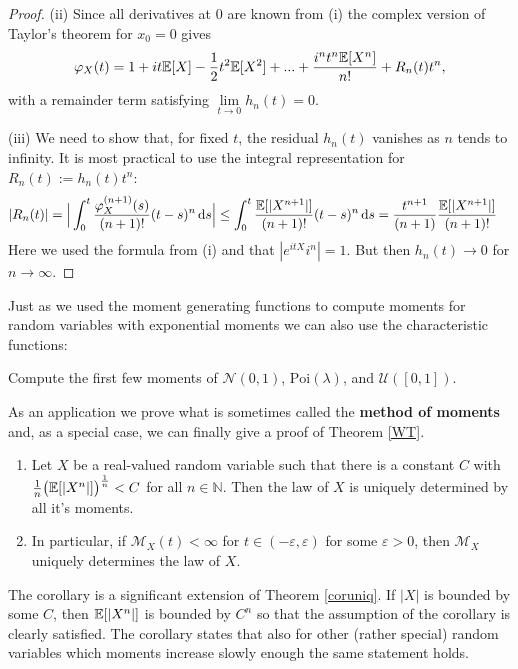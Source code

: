 \begin{proof}[Proof]
	(ii) Since all derivatives at $0$ are known from (i) the complex version of Taylor's theorem for $x_0 =0$ gives
			\begin{align*}
				\varphi_X(t) = 1+  i t \mathbb{E}[X] - \frac{1}{2} t^2 \mathbb{E} [ X^2] + ... + \frac{i^n t^n\mathbb{E} [X^n]}{n!} + R_n(t)t^n,
			\end{align*}
			with a remainder term satisfying $\lim\limits_{t\to 0} h_n(t) = 0$.\smallskip

	(iii)
			We need to show that, for fixed $t$, the residual $h_n(t)$ vanishes as $n$ tends to infinity. It is most practical to use the integral representation for $R_n(t):=h_n(t)t^n$:
			\begin{align*}
				\lvert R_n(t) \rvert = \Big\lvert \int_0^t \frac{\varphi_X^{(n+1)}(s)}{(n+1)!}(t-s)^n \, \mathrm{d} s \Big\rvert &\leq \int_0^t \frac{\mathbb{E} [ \lvert X^{n+1}\rvert] }{(n+1)!}(t-s)^n \, \mathrm{d} s
				 = \frac{t^{n+1}}{(n+1)} \frac{\mathbb{E}[ \lvert X^{n+1}\rvert ]}{(n+1)!}
			\end{align*}
			Here we used the formula from (i) and that $|e^{itX}i^n|=1$. But then $h_n(t)\to 0$ for $n\to\infty$.
\end{proof}
Just as we used the moment generating functions to compute moments for random variables with exponential moments we can also use the characteristic functions:
\begin{luebung}
	Compute the first few moments of $\mathcal N(0,1)$, $\text{Poi}(\lambda)$, and $\mathcal U([0,1])$.
\end{luebung}
As an application we prove what is sometimes called the \textbf{method of moments} and, as a special case, we can finally give a proof of Theorem \ref{WT}.
\begin{llemma}
\begin{corollary}
	\begin{enumerate}[label=(\roman*)]
		\item
			Let $X$ be a real-valued random variable such that there is a constant $C$ with $\frac{1}{n} \big( \mathbb{E}[\lvert X^n \rvert ] \big)^{\frac{1}{n}}< C$ for all $n\in \mathbb{N}$. Then the law of $X$ is uniquely determined by all it's moments.
		\item
			In particular, if $\mathcal M_X(t) < \infty$ for $t \in (-\varepsilon,\varepsilon)$ for some $\varepsilon > 0$, then $\mathcal M_X$ uniquely determines the law of $X$.
	\end{enumerate}
\end{corollary}
\end{llemma}
The corollary is a significant extension of Theorem \ref{coruniq}. If $|X|$ is bounded by some $C$, then $\mathbb{E}[|X^n|]$ is bounded by $C^n$ so that the assumption of the corollary is clearly satisfied. The corollary states that also for other (rather special) random variables which moments increase slowly enough the same statement holds.
